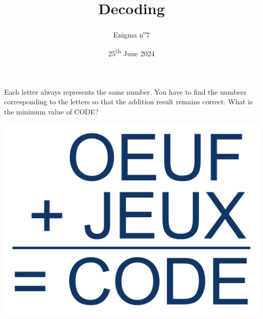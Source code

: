 \documentclass[a4paper, top=10mm]{article}
\title{\textbf{\huge{Decoding}}}
\author{Enigma n\textsuperscript{o}7}
\date{25\textsuperscript{th} June 2024}
\begin{document}
	\maketitle
	
	\Large
	Each letter always represents the same number.
	You have to find the numbers corresponding to the letters so that the addition result remains correct.
	What is the minimum value of CODE?
	
	\vspace{2cm}
	
	\begin{center}
		\includegraphics[width=\linewidth]{07addition.pdf}
	\end{center}
	
	
	
\end{document}
